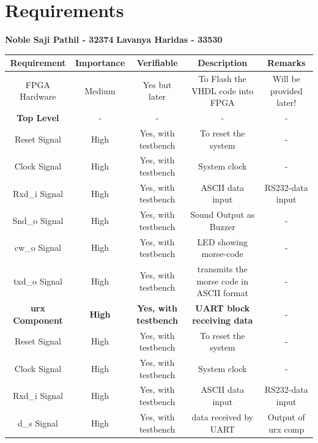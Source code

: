 \documentclass[12pt,a4paper, landscape]{article}
\newcommand\tab[1][1cm]{\hspace*{#1}}
\begin{document}
\newpage
\pagestyle{fancy}
\fancyfoot{}
\fancyhead{}

\setlength{\footskip=0pt}
\setlength{\headheight=35pt}

\newpage


\section*{Requirements}

\tab \tab \tab \tab \tab \tab \tab \textbf{Noble Saji Pathil - 32374 } \tab \textbf{Lavanya Haridas - 33530}

\begin{table}[h!]
\centering
\begin{tabular}{|c||c|c|c|c|} 
 \hline
 \textbf{Requirement} & \textbf{Importance}& \textbf{Verifiable} & \textbf{Description} & \textbf{Remarks} \\ [0.5ex] 
 \hline
 FPGA Hardware & Medium & Yes but later & To Flash the VHDL code into FPGA & Will be provided later! \\ [0.5ex] 
  \hline
  \textbf{Top Level} & - & - & - & -\\ [0.5ex]
 \hline
  Reset Signal & High & Yes, with testbench & To reset the system & -\\ [0.5ex] 
 \hline
 Clock Signal & High & Yes, with testbench & System clock & - \\ [0.5ex] 
 \hline
 Rxd\_i Signal & High & Yes, with testbench & ASCII data input & RS232-data input \\ [0.5ex] 
 \hline
  Snd\_o Signal & High & Yes, with testbench & Sound Output as Buzzer  & - \\ [0.5ex] 
 \hline
  cw\_o Signal & High & Yes, with testbench & LED showing morse-code & - \\ [0.5ex] 
 \hline
  txd\_o Signal & High & Yes, with testbench & transmits the morse code in ASCII format & - \\[0.5ex] 
 \hline
  \textbf{urx Component} & \textbf{High} & \textbf{Yes, with testbench} & \textbf{UART block receiving data} & - \\[0.5ex] 
 \hline 
  Reset Signal & High & Yes, with testbench & To reset the system & -\\ [0.5ex] 
 \hline
 Clock Signal & High & Yes, with testbench & System clock & - \\ [0.5ex] 
 \hline
 Rxd\_i Signal & High & Yes, with testbench & ASCII data input & RS232-data input \\ [0.5ex] 
 \hline
 d\_s Signal & High & Yes, with testbench & data received by UART & Output of urx comp \\ [0.5ex] 

\end{tabular}
\end{table}
\end{document}
